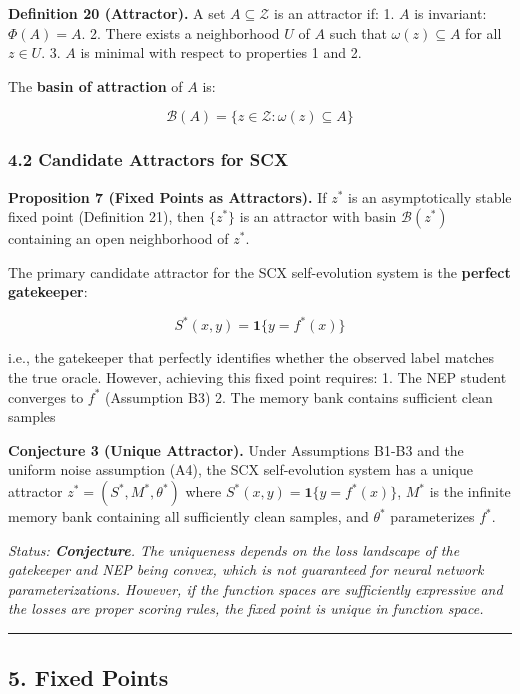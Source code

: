 \documentclass[
  12pt,
]{ctexart}
\begin{document}
\textbf{Definition 20 (Attractor).} A set \(A \subseteq \mathcal{Z}\) is
an attractor if: 1. \(A\) is invariant: \(\Phi(A) = A\). 2. There exists
a neighborhood \(U\) of \(A\) such that \(\omega(z) \subseteq A\) for
all \(z \in U\). 3. \(A\) is minimal with respect to properties 1 and 2.

The \textbf{basin of attraction} of \(A\) is:

\[\mathcal{B}(A) = \{ z \in \mathcal{Z} : \omega(z) \subseteq A \}\]

\subsubsection{4.2 Candidate Attractors for
SCX}\label{candidate-attractors-for-scx}

\textbf{Proposition 7 (Fixed Points as Attractors).} If \(z^*\) is an
asymptotically stable fixed point (Definition 21), then \(\{z^*\}\) is
an attractor with basin \(\mathcal{B}(z^*)\) containing an open
neighborhood of \(z^*\).

The primary candidate attractor for the SCX self-evolution system is the
\textbf{perfect gatekeeper}:

\[S^*(x,y) = \mathbf{1}\{y = f^*(x)\}\]

i.e., the gatekeeper that perfectly identifies whether the observed
label matches the true oracle. However, achieving this fixed point
requires: 1. The NEP student converges to \(f^*\) (Assumption B3) 2. The
memory bank contains sufficient clean samples

\textbf{Conjecture 3 (Unique Attractor).} Under Assumptions B1-B3 and
the uniform noise assumption (A4), the SCX self-evolution system has a
unique attractor \(z^* = (S^*, M^*, \theta^*)\) where
\(S^*(x,y) = \mathbf{1}\{y = f^*(x)\}\), \(M^*\) is the infinite memory
bank containing all sufficiently clean samples, and \(\theta^*\)
parameterizes \(f^*\).

\emph{Status: \textbf{Conjecture}. The uniqueness depends on the loss
landscape of the gatekeeper and NEP being convex, which is not
guaranteed for neural network parameterizations. However, if the
function spaces are sufficiently expressive and the losses are proper
scoring rules, the fixed point is unique in function space.}

\begin{center}\rule{0.5\linewidth}{0.5pt}\end{center}

\subsection{5. Fixed Points}\label{fixed-points}
\end{document}
